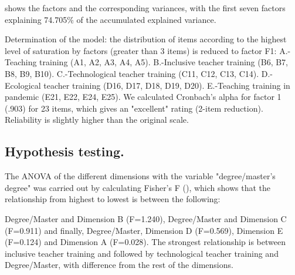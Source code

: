 \documentclass[english]{textolivre}
\begin{document}
 shows the factors and the corresponding variances, with the first seven factors explaining 74.705\% of the accumulated explained variance.

Determination of the model: the distribution of items according to the highest level of saturation by factors (greater than 3 items) is reduced to factor F1: A.-Teaching training (A1, A2, A3, A4, A5). B.-Inclusive teacher training (B6, B7, B8, B9, B10). C.-Technological teacher training (C11, C12, C13, C14). D.-Ecological teacher training (D16, D17, D18, D19, D20). E.-Teaching training in pandemic (E21, E22, E24, E25). We calculated Cronbach's alpha for factor 1 (.903) for 23 items, which gives an "excellent" rating (2-item reduction). Reliability is slightly higher than the original scale.

\subsection{Hypothesis testing.}\label{subhypotest}
The ANOVA of the different dimensions with the variable "degree/master's degree" was carried out by calculating Fisher's F (), which shows that the relationship from highest to lowest is between the following:

Degree/Master and Dimension B (F=1.240), Degree/Master and Dimension C (F=0.911) and finally, Degree/Master, Dimension D (F=0.569), Dimension E (F=0.124) and Dimension A (F=0.028). The strongest relationship is between inclusive teacher training and followed by technological teacher training and Degree/Master, with difference from the rest of the dimensions.
\end{document}
